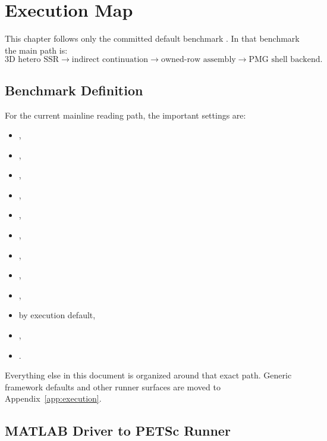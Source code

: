 \chapter{Execution Map}

This chapter follows only the committed default benchmark
. In that benchmark the
main path is:
\[
\text{3D hetero SSR} \rightarrow
\text{indirect continuation} \rightarrow
\text{owned-row assembly} \rightarrow
\text{PMG shell backend}.
\]

\section{Benchmark Definition}

For the current mainline reading path, the important settings are:
\begin{itemize}
\item {},
\item {},
\item {},
\item {},
\item {},
\item {},
\item {},
\item {},
\item {},
\item {} by execution default,
\item {},
\item {}.
\end{itemize}

Everything else in this document is organized around that exact path. Generic
framework defaults and other runner surfaces are moved to
Appendix~\ref{app:execution}.

\section{MATLAB Driver to PETSc Runner}

